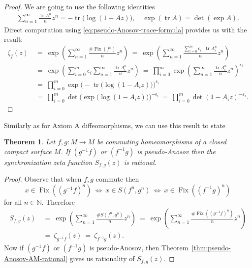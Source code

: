 \documentclass[oneside]{amsart}
\def\N{\mathbb{N}}
\def\Fix{\operatorname{Fix}}
\def\tr{\operatorname{tr}}
\newtheorem{thm}{Theorem}
\begin{document}
\begin{proof}
  We are going to use the following identities
  \begin{align*}
    \sum_{n=1}^\infty \frac{\tr A^n}{n} z^n = -\tr \big( \log (1 - Az) \big), \quad
    \exp(\tr A) = \det(\exp A).
  \end{align*}
  Direct computation using \eqref{eq:pseudo-Anosov-trace-formula} provides us with the result:
  \begin{align*}
    \zeta_f(z) \ &= \ \exp \left( \sum_{n=1}^\infty \frac{\#\Fix(f^n)}{n} z^n \right)
                  \ = \ \exp \left( \sum_{n=1}^\infty \frac{\sum_{i=0}^m \epsilon_i \cdot \tr A_i^n}{n} z^n \right) \\
                 &= \ \exp \left( \sum_{i=0}^m \epsilon_i \sum_{n=1}^\infty \frac{\tr A_i^n}{n} z^n \right)
                  \ = \ \prod_{i=0}^m \exp \left( \sum_{n=1}^\infty \frac{\tr A_i^n}{n} z^n \right)^{\epsilon_i} \\
                 &= \ \prod_{i=0}^m \exp \Big( -\tr \big(\log(1 - A_i z) \big) \Big)^{\epsilon_i} \\
                 &= \ \prod_{i=0}^m \det \Big( \exp \big(\log(1 - A_i z) \big) \Big)^{-\epsilon_i}
                  \ = \ \prod_{i=0}^m \det(1 - A_i z)^{-\varepsilon_i}.
  \end{align*}
\end{proof}

Similarly as for Axiom A diffeomorphisms, we can use this result to state
\begin{thm}\label{thm:pseudo-Anosov-AM-rational2}
  Let $f,g: M \to M$ be commuting homeomorphisms of a closed compact surface $M$.
  If $(g^{-1}f)$ or $(f^{-1}g)$ is pseudo-Anosov then the synchronization zeta function $S_{f,g}(z)$
  is rational.
\end{thm}
\begin{proof}
  Observe that when $f, g$ commute then
  \begin{equation*}
    x \in \Fix \left( (g^{-1}f)^n \right) \ \Leftrightarrow \ x \in S(f^n, g^n) \ \Leftrightarrow \
      x \in \Fix \left( (f^{-1}g)^n \right)
  \end{equation*}
  for all $n \in \N$.
  Therefore
  \begin{align*}
    S_{f,g}(z) \ &= \ \exp \left( \sum_{n=1}^\infty \frac{\# S(f^n,g^n)}{n} z^n \right)
                  \ = \ \exp \left( \sum_{n=1}^\infty \frac{\# \Fix\left((g^{-1}f)^n\right)}{n} z^n \right) \\
                 &= \ \zeta_{g^{-1}f}(z) \ = \ \zeta_{f^{-1}g}(z) .
  \end{align*}
  Now if $(g^{-1}f)$ or $(f^{-1}g)$ is pseudo-Anosov, then Theorem~\ref{thm:pseudo-Anosov-AM-rational}
  gives us rationality of $S_{f,g}(z)$.
\end{proof}
\end{document}
